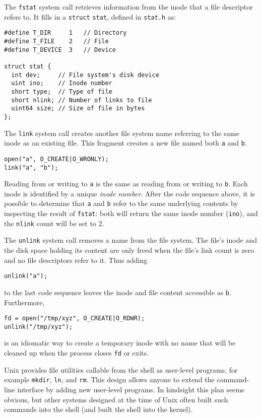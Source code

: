 The
\lstinline{fstat}
system call
retrieves information from the inode that a
file descriptor refers to.
It fills in a
\lstinline{struct}
\lstinline{stat},
defined in
\lstinline{stat.h} 
as:
\begin{lstlisting}[]
#define T_DIR     1   // Directory
#define T_FILE    2   // File
#define T_DEVICE  3   // Device

struct stat {
  int dev;     // File system's disk device
  uint ino;    // Inode number
  short type;  // Type of file
  short nlink; // Number of links to file
  uint64 size; // Size of file in bytes
};
\end{lstlisting}

The
\lstinline{link}
system call creates another file system name 
referring to the same inode as an existing file.
This fragment creates a new file named both
\lstinline{a}
and
\lstinline{b}.
\begin{lstlisting}[]
open("a", O_CREATE|O_WRONLY);
link("a", "b");
\end{lstlisting}
Reading from or writing to
\lstinline{a}
is the same as reading from or writing to
\lstinline{b}.
Each inode is identified by a unique
\textit{inode}
\textit{number}.
After the code sequence above, it is possible
to determine that
\lstinline{a}
and
\lstinline{b}
refer to the same underlying contents by inspecting the
result of 
\lstinline{fstat}:
both will return the same inode number 
(\lstinline{ino}),
and the
\lstinline{nlink}
count will be set to 2.

The
\lstinline{unlink}
system call removes a name from the file system.
The file's inode and the disk space holding its content
are only freed when the file's link count is zero and
no file descriptors refer to it.
Thus adding
\begin{lstlisting}[]
unlink("a");
\end{lstlisting}
to the last code sequence leaves the inode
and file content accessible as
\lstinline{b}.
Furthermore,
\begin{lstlisting}[]
fd = open("/tmp/xyz", O_CREATE|O_RDWR);
unlink("/tmp/xyz");
\end{lstlisting}
is an idiomatic way to create a temporary inode 
with no name
that will be cleaned up when the process closes 
\lstinline{fd}
or exits.

Unix provides
file utilities callable from the shell
as user-level programs, for example
\lstinline{mkdir},
\lstinline{ln},
and
\lstinline{rm}.
This design allows anyone to extend the command-line interface
by adding new user-level programs.  In hindsight this plan seems obvious,
but other systems designed at the time of Unix often built such commands into
the shell (and built the shell into the kernel).

